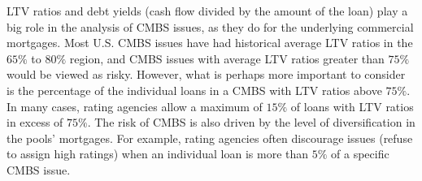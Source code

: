 \documentclass[11pt]{article}
\begin{document}
LTV ratios and debt yields (cash flow divided by the amount of the loan) play a big role in the analysis of CMBS issues, as they do for the underlying commercial mortgages. Most U.S. CMBS issues have had historical average LTV ratios in the $65 \%$ to $80 \%$ region, and CMBS issues with average LTV ratios greater than $75 \%$ would be viewed as risky. However, what is perhaps more important to consider is the percentage of the individual loans in a CMBS with LTV ratios above $75 \%$. In many cases, rating agencies allow a maximum of $15 \%$ of loans with LTV ratios in excess of $75 \%$. The risk of CMBS is also driven by the level of diversification in the pools' mortgages. For example, rating agencies often discourage issues (refuse to assign high ratings) when an individual loan is more than $5 \%$ of a specific CMBS issue.
\end{document}
